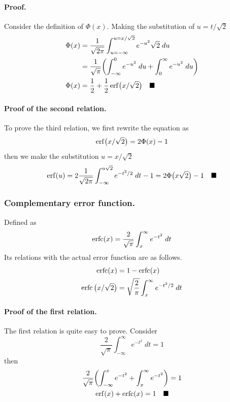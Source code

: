 \documentclass[../../main.tex]{subfiles}
\begin{document}
\paragraph{Proof.} Consider the definition of $\Phi(x)$. Making the substitution of $u=t/\sqrt{2}$
\begin{align*}
    \Phi(x)&=\frac{1}{\sqrt{2\pi}}\int_{u=-\infty}^{u=x/\sqrt{2}}e^{-u^2}\sqrt{2}\;du\\
    &=\frac{1}{\sqrt{\pi}} \biggl(\int_{-\infty}^{0}e^{-u^2}\;du+ \int_{0}^{\infty}e^{-u^2}\;du\biggr)\\
    \Phi(x)&=\frac{1}{2}+\frac{1}{2}\operatorname{erf}\bigl(x/\sqrt{2}\bigr)\quad\blacksquare
\end{align*}

\paragraph{Proof of the second relation.} To prove the third relation, we first rewrite the equation as
\begin{align*}
    \operatorname{erf}\bigl(x/\sqrt{2}\bigr)= 2\Phi(x)-1
\end{align*}
then we make the substitution $u=x/\sqrt{2}$
\begin{align*}
    \operatorname{erf}(u)= 2\frac{1}{\sqrt{2\pi}}\int_{-\infty}^{u\sqrt{2}} e^{-t^2/2}\;dt-1=2\Phi\bigl(x\sqrt{2}\bigr)-1\quad\blacksquare
\end{align*}

\subsubsection*{Complementary error function.} Defined as 
\begin{equation*}
    \operatorname{erfc}(x)=\frac{2}{\sqrt{\pi}}\int_{x}^{\infty}e^{-t^2}\;dt
\end{equation*}
Its relations with the actual error function are as follows.
\begin{align*}
    \operatorname{erfc}(x)&=1-\operatorname{erfc}(x)\\
    \operatorname{erfc}\big(x/\sqrt{2}\big)&=\sqrt{\frac{2}{\pi}}\int_{x}^{\infty}e^{-t^2/2}\;dt
\end{align*}

\paragraph{Proof of the first relation.} The first relation is quite easy to prove. Consider
\begin{equation*}
    \frac{2}{\sqrt{\pi}}\int_{-\infty}^{\infty}e^{-t^2}\;dt=1
\end{equation*}
then
\begin{align*}
    \frac{2}{\sqrt{\pi}}\biggl(\int_{-\infty}^{x}e^{-t^2}+\int_{x}^{\infty}e^{-t^2}\biggr)&=1\\
    \operatorname{erf}(x)+\operatorname{erfc}(x)=1\quad\blacksquare
\end{align*}
\end{document}
